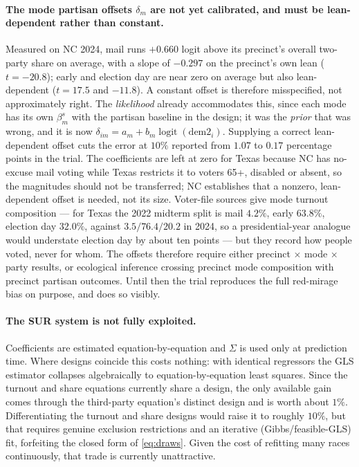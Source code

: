 \documentclass[11pt]{article}
\newcommand{\logit}{\operatorname{logit}}
\begin{document}
\paragraph{The mode partisan offsets $\delta_m$ are not yet calibrated, and must be
lean-dependent rather than constant.} Measured on NC 2024, mail runs $+0.660$ logit above
its precinct's overall two-party share on average, with a slope of $-0.297$ on the
precinct's own lean ($t=-20.8$); early and election day are near zero on average but also
lean-dependent ($t=17.5$ and $-11.8$). A constant offset is therefore misspecified, not
approximately right. The \emph{likelihood} already accommodates this, since each mode has
its own $\beta^{s}_{m}$ with the partisan baseline in the design; it was the \emph{prior}
that was wrong, and it is now $\delta_{im} = a_m + b_m \logit(\text{dem2}_i)$. Supplying a
correct lean-dependent offset cuts the error at $10\%$ reported from $1.07$ to $0.17$
percentage points in the trial. The coefficients are left at zero for Texas because NC has
no-excuse mail voting while Texas restricts it to voters 65+, disabled or absent, so the
magnitudes should not be transferred; NC establishes that a nonzero, lean-dependent offset
is needed, not its size. Voter-file sources give
mode turnout composition --- for Texas the 2022 midterm split is mail $4.2\%$, early
$63.8\%$, election day $32.0\%$, against $3.5/76.4/20.2$ in 2024, so a presidential-year
analogue would understate election day by about ten points --- but they record how people
voted, never for whom. The offsets therefore require either precinct $\times$ mode
$\times$ party results, or ecological inference crossing precinct mode composition with
precinct partisan outcomes. Until then the trial reproduces the full red-mirage bias on
purpose, and does so visibly.

\paragraph{The SUR system is not fully exploited.} Coefficients are estimated
equation-by-equation and $\Sigma$ is used only at prediction time. Where designs coincide
this costs nothing: with identical regressors the GLS estimator collapses algebraically to
equation-by-equation least squares. Since the turnout and share equations currently share a
design, the only available gain comes through the third-party equation's distinct design
and is worth about $1\%$. Differentiating the turnout and share designs would raise it to
roughly $10\%$, but that requires genuine exclusion restrictions and an iterative
(Gibbs/feasible-GLS) fit, forfeiting the closed form of \eqref{eq:draws}. Given the cost of
refitting many races continuously, that trade is currently unattractive.
\end{document}
